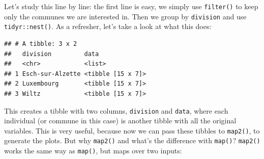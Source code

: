 \documentclass[]{gitbook}
\newenvironment{Shaded}{\begin{snugshade}}{\end{snugshade}}
\newcommand{\DataTypeTok}[1]{\textcolor[rgb]{0.13,0.29,0.53}{#1}}
\newcommand{\DecValTok}[1]{\textcolor[rgb]{0.00,0.00,0.81}{#1}}
\newcommand{\KeywordTok}[1]{\textcolor[rgb]{0.13,0.29,0.53}{\textbf{#1}}}
\newcommand{\NormalTok}[1]{#1}
\newcommand{\OperatorTok}[1]{\textcolor[rgb]{0.81,0.36,0.00}{\textbf{#1}}}
\newcommand{\StringTok}[1]{\textcolor[rgb]{0.31,0.60,0.02}{#1}}
\begin{document}
\begin{Shaded}
\end{Shaded}

Let's study this line by line: the first line is easy, we simply use \texttt{filter()} to keep only the
communes we are interested in. Then we group by \texttt{division} and use \texttt{tidyr::nest()}. As a refresher,
let's take a look at what this does:

\begin{Shaded}
\end{Shaded}

\begin{verbatim}
## # A tibble: 3 x 2
##   division         data             
##   <chr>            <list>           
## 1 Esch-sur-Alzette <tibble [15 x 7]>
## 2 Luxembourg       <tibble [15 x 7]>
## 3 Wiltz            <tibble [15 x 7]>
\end{verbatim}

This creates a tibble with two columns, \texttt{division} and \texttt{data}, where each individual (or
commune in this case) is another tibble with all the original variables. This is very useful,
because now we can pass these tibbles to \texttt{map2()}, to generate the plots. But why \texttt{map2()} and
what's the difference with \texttt{map()}? \texttt{map2()} works the same way as \texttt{map()}, but maps over two
inputs:
\end{document}
